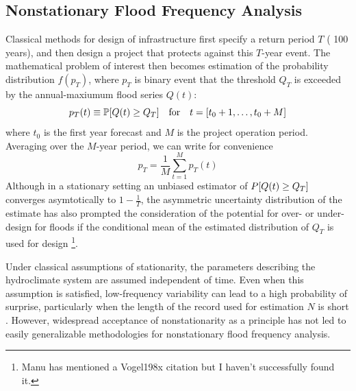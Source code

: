 \documentclass[12pt]{article}
\begin{document}
\subsection{Nonstationary Flood Frequency Analysis\label{sec:ffa}}

Classical methods for design of infrastructure first specify a return period \(T\) (\ie{} 100 years), and then design a project that protects against this \(T\)-year event.
The mathematical problem of interest then becomes estimation of the probability distribution \( f(p_T) \), where \( p_T \) is binary event that the threshold \( Q_T \) is exceeded by the annual-maxiumum flood series \( Q(t) \):
\begin{equation}
  p_T(t) \equiv \probability \qty[ Q(t) \geq Q_T] \qqtext{for} t = \qty[t_0 + 1, \ldots, t_0 + M]
\end{equation}
where \( t_0 \) is the first year forecast and \( M \) is the project operation period.
Averaging over the \(M\)-year period, we can write for convenience
\begin{equation}
  p_T = \frac{1}{M} \sum_{t=1}^{M} p_T(t)
\end{equation}
Although in a stationary setting an unbiased estimator of \( P \qty[ Q(t) \geq Q_T] \) converges asymtotically to \(1 - \frac{1}{T}\), the asymmetric uncertainty distribution of the estimate has also prompted the consideration of the potential for over- or under-design for floods if the conditional mean of the estimated distribution of \( Q_T \) is used for design \citep{Stedinger1997}\footnote{Manu has mentioned a Vogel198x citation but I haven't successfully found it.}.

Under classical assumptions of stationarity, the parameters describing the hydroclimate system are assumed independent of time.
Even when this assumption is satisfied, low-frequency variability can lead to a high probability of surprise, particularly when the length of the record used for estimation \(N\) is short \citep{Jain2001,Matalas2012}.
However, widespread acceptance of nonstationarity as a principle has not led to easily generalizable methodologies for nonstationary flood frequency analysis.
\end{document}
